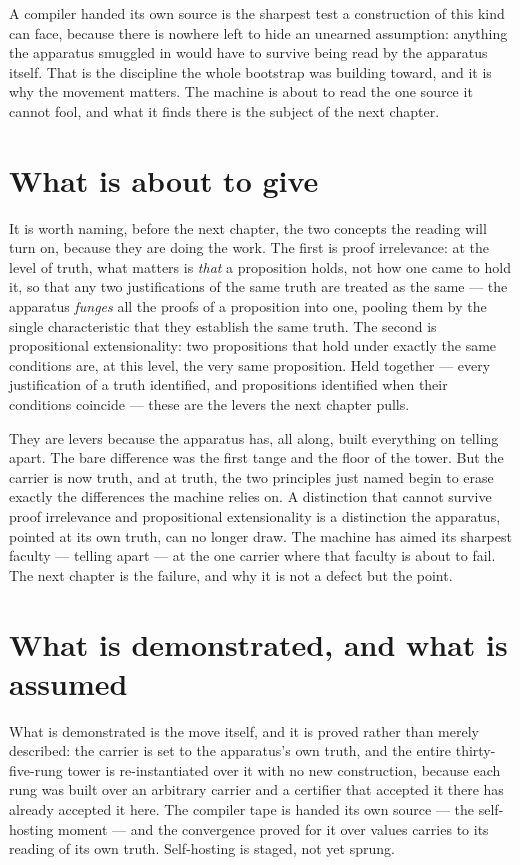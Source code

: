 A compiler handed its own source is the sharpest test a construction of this kind can face, because there
is nowhere left to hide an unearned assumption: anything the apparatus smuggled in would have to survive
being read by the apparatus itself. That is the discipline the whole bootstrap was building toward, and it
is why the movement matters. The machine is about to read the one source it cannot fool, and what it finds
there is the subject of the next chapter.

\section{What is about to give}
\label{se:what-is-about-to-give}

It is worth naming, before the next chapter, the two concepts the reading will turn on, because they are
doing the work. The first is proof
irrelevance: at the level of truth, what matters is \emph{that} a proposition holds, not how one came to
hold it, so that any two justifications of the same truth are treated as the same --- the apparatus
\emph{funges} all the proofs of a proposition into one, pooling them by the single characteristic that they
establish the same truth. The second is propositional extensionality: two propositions that hold under
exactly the same conditions are, at this level, the very same proposition. Held together --- every
justification of a truth identified, and propositions identified when their conditions coincide --- these
are the levers the next chapter pulls.

They are levers because the apparatus has, all along, built everything on telling apart. The bare
difference was the first tange and the floor of the tower. But the carrier is now truth, and at truth, the
two principles just named begin to erase exactly the differences the machine relies on. A distinction that
cannot survive proof irrelevance and propositional extensionality is a distinction the apparatus, pointed
at its own truth, can no longer draw. The machine has aimed its sharpest faculty --- telling apart --- at
the one carrier where that faculty is about to fail. The next chapter is the failure, and why it is not a
defect but the point.

\section{What is demonstrated, and what is assumed}
\label{se:demonstrated-assumed-II1}

What is demonstrated is the move itself, and it is proved rather than merely described: the carrier is set
to the apparatus's own truth, and the entire thirty-five-rung tower is re-instantiated over it with no new
construction, because each rung was built over an arbitrary carrier and a certifier that accepted it there
has already accepted it here. The compiler tape is handed its own source --- the self-hosting moment ---
and the convergence proved for it over values carries to its reading of its own truth. Self-hosting is
staged, not yet sprung.

